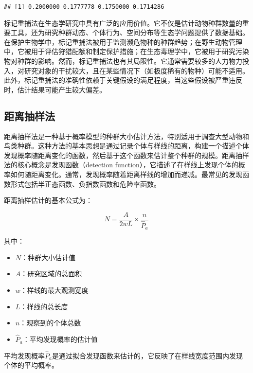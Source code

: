 \documentclass[
  twoside,12pt,fontset=none]{ctexbook}
\providecommand{\tightlist}{%
  \setlength{\itemsep}{0pt}\setlength{\parskip}{0pt}}
\begin{document}
\begin{verbatim}
## [1] 0.2000000 0.1777778 0.1750000 0.1714286
\end{verbatim}

标记重捕法在生态学研究中具有广泛的应用价值。它不仅是估计动物种群数量的重要工具，还为研究种群动态、个体行为、空间分布等生态学问题提供了数据基础。在保护生物学中，标记重捕法被用于监测濒危物种的种群趋势；在野生动物管理中，它被用于评估狩猎配额和制定保护措施；在生态毒理学中，它被用于研究污染物对种群的影响。然而，标记重捕法也有其局限性。它通常需要较多的人力物力投入，对研究对象的干扰较大，且在某些情况下（如极度稀有的物种）可能不适用。此外，标记重捕法的准确性依赖于关键假设的满足程度，当这些假设被严重违反时，估计结果可能产生较大偏差。

\hypertarget{ux8dddux79bbux62bdux6837ux6cd5}{%
\subsection{距离抽样法}\label{ux8dddux79bbux62bdux6837ux6cd5}}

距离抽样法是一种基于概率模型的种群大小估计方法，特别适用于调查大型动物和鸟类种群。这种方法的基本思想是通过记录个体与样线的距离，构建一个描述个体发现概率随距离变化的函数，然后基于这个函数来估计整个种群的规模。距离抽样法的核心概念是发现函数（detection function），它描述了在样线上发现个体的概率如何随距离变化。通常，发现概率随着距离样线的增加而递减。最常见的发现函数形式包括半正态函数、负指数函数和危险率函数。

距离抽样估计的基本公式为：

\[N = \frac{A}{2wL} \times \frac{n}{\hat{P}_a}\]

其中：

\begin{itemize}
\tightlist
\item
  \(N\)：种群大小估计值\\
\item
  \(A\)：研究区域的总面积\\
\item
  \(w\)：样线的最大观测宽度\\
\item
  \(L\)：样线的总长度\\
\item
  \(n\)：观察到的个体总数\\
\item
  \(\hat{P}_a\)：平均发现概率的估计值
\end{itemize}

平均发现概率\(\hat{P}_a\)是通过拟合发现函数来估计的，它反映了在样线宽度范围内发现个体的平均概率。
\end{document}
